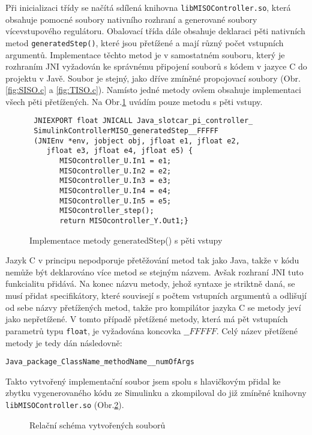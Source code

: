 \documentclass[thesis=M,czech,hidelinks]{FITthesis}[2012/06/26]
\begin{document}
Při inicializaci třídy se načítá sdílená knihovna \texttt{libMISOController.so}, která obsahuje pomocné soubory nativního rozhraní a generované soubory vícevstupového regulátoru. Obalovací třída dále obsahuje deklaraci pěti nativních metod \texttt{generatedStep()}, které jsou přetížené a mají různý počet vstupních argumentů. Implementace těchto metod je v samostatném souboru, který je rozhraním JNI vyžadován ke správnému připojení souborů s kódem v jazyce C do projektu v Javě. Soubor je stejný, jako dříve zmíněné propojovací soubory (Obr. \ref{fig:SISO.c} a \ref{fig:TISO.c}). Namísto jedné metody ovšem obsahuje implementaci všech pěti přetížených. Na Obr.\ref{fig:MISO.c} uvádím pouze metodu s pěti vstupy.
 \begin{figure}[h]           
   \begin{verbatim}
 JNIEXPORT float JNICALL Java_slotcar_pi_controller_
 SimulinkControllerMISO_generatedStep__FFFFF
 (JNIEnv *env, jobject obj, jfloat e1, jfloat e2,
    jfloat e3, jfloat e4, jfloat e5) {
       MISOcontroller_U.In1 = e1;
       MISOcontroller_U.In2 = e2;
       MISOcontroller_U.In3 = e3;
       MISOcontroller_U.In4 = e4;
       MISOcontroller_U.In5 = e5;
       MISOcontroller_step();
       return MISOcontroller_Y.Out1;} 
   \end{verbatim}      
   \caption{Implementace metody generatedStep() s pěti vstupy}
   \label{fig:MISO.c}
 \end{figure}
 \setlength{\parskip}{10pt}
 
Jazyk C v principu nepodporuje přetěžování metod tak jako Java, takže v kódu nemůže být deklarováno více metod se stejným názvem. Avšak rozhraní JNI tuto funkcialitu přidává. Na konec názvu metody, jehož syntaxe je striktně daná, se musí přidat specifikátory, které souvisejí s počtem vstupních argumentů a odlišují od sebe názvy přetížených metod, takže pro kompilátor jazyka C se metody jeví jako nepřetížené. V tomto případě přetížené metody, která má pět vstupních parametrů typu \texttt{float}, je vyžadována koncovka $\_\_FFFFF$. Celý název přetížené metody je tedy dán následovně:
\setlength{\parskip}{1pt}
\begin{lstlisting}[backgroundcolor=\color{white}, framerule=0pt]
      Java_package_ClassName_methodName__numOfArgs
   \end{lstlisting}
Takto vytvořený implementační soubor jsem spolu s hlavičkovým přidal ke zbytku vygenerovaného kódu ze Simulinku a zkompiloval do již zmíněné knihovny \texttt{libMISOController.so} (Obr.\ref{fig:miso}).
 \begin{figure}[h]
         \centering
         \caption{Relační schéma vytvořených souborů}
         \label{fig:miso}
 \end{figure}
 
\end{document}
